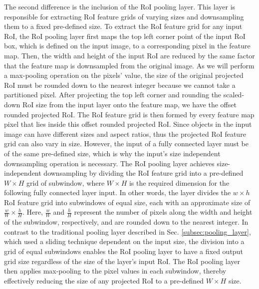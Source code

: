 The second difference is the inclusion of the RoI pooling layer. This layer is responsible for extracting RoI feature grids of varying sizes and downsampling them to a fixed pre-defined size. To extract the RoI feature grid for any input RoI, the RoI pooling layer first maps the top left corner point of the input RoI box, which is defined on the input image, to a corresponding pixel in the feature map. Then, the width and height of the input RoI are reduced by the same factor that the feature map is downsampled from the original image. As we will perform a max-pooling operation on the pixels' value, the size of the original projected RoI must be rounded down to the nearest integer because we cannot take a partitioned pixel. After projecting the top left corner and rounding the scaled-down RoI size from the input layer onto the feature map, we have the offset rounded projected RoI. The RoI feature grid is then formed by every feature map pixel that lies inside this offset rounded projected RoI. Since objects in the input image can have different sizes and aspect ratios, thus the projected RoI feature grid can also vary in size. However, the input of a fully connected layer must be of the same pre-defined size, which is why the input's size independent downsampling operation is necessary. The RoI pooling layer achieves size-independent downsampling by dividing the RoI feature grid into a pre-defined $W \times H$ grid of subwindow, where $W \times H$ is the required dimension for the following fully connected layer input. In other words, the layer divides the $w \times h$ RoI feature grid into subwindows of equal size, each with an approximate size of $\frac{w}{W} \times \frac{h}{H}$. Here, $\frac{w}{W}$ and $\frac{h}{H}$ represent the number of pixels along the width and height of the subwindow, respectively, and are rounded down to the nearest integer. In contrast to the traditional pooling layer described in Sec. \ref{subsec:pooling_layer}, which used a sliding technique dependent on the input size, the division into a grid of equal subwindows enables the RoI pooling layer to have a fixed output grid size regardless of the size of the layer's input RoI. The RoI pooling layer then applies max-pooling to the pixel values in each subwindow, thereby effectively reducing the size of any projected RoI to a pre-defined $W \times H$ size.

